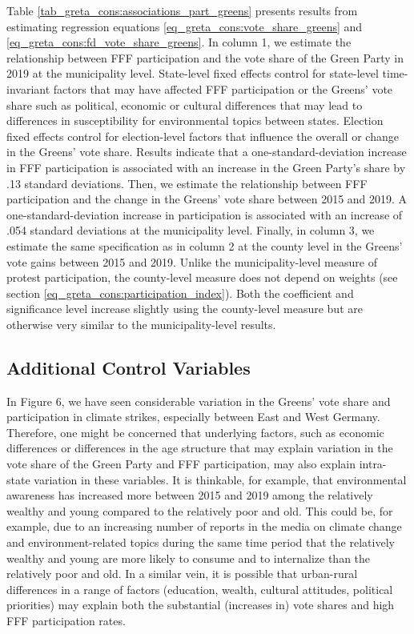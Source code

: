 Table \ref{tab_greta_cons:associations_part_greens} presents results from estimating regression equations \ref{eq_greta_cons:vote_share_greens} and \ref{eq_greta_cons:fd_vote_share_greens}. In column 1, we estimate the relationship between FFF participation and the vote share of the Green Party in 2019 at the municipality level. State-level fixed effects control for state-level time-invariant factors that may have affected FFF participation or the Greens' vote share such as political, economic or cultural differences that may lead to differences in susceptibility for environmental topics between states. Election fixed effects control for election-level factors that influence the overall or change in the Greens' vote share. Results indicate that a one-standard-deviation increase in FFF participation is associated with an increase in the Green Party's share by .13 standard deviations. Then, we estimate the relationship between FFF participation and the change in the Greens' vote share between 2015 and 2019. A one-standard-deviation increase in participation is associated with an increase of .054 standard deviations at the municipality level. Finally, in column 3, we estimate the same specification as in column 2 at the county level in the Greens' vote gains between 2015 and 2019. Unlike the municipality-level measure of protest participation, the county-level measure does not depend on weights (see section \ref*{eq_greta_cons:participation_index}). Both the coefficient and significance level increase slightly using the county-level measure but are otherwise very similar to the municipality-level results. 





\subsection{Additional Control Variables}




In Figure 6, we have seen considerable variation in the Greens' vote share and participation in climate strikes, especially between East and West Germany. Therefore, one might be concerned that underlying factors, such as economic differences or differences in the age structure that may explain variation in the vote share of the Green Party and FFF participation, may also explain intra-state variation in these variables. It is thinkable, for example, that environmental awareness has increased more between 2015 and 2019 among the relatively wealthy and young compared to the relatively poor and old. This could be, for example, due to an increasing number of reports in the media on climate change and environment-related topics during the same time period that the relatively wealthy and young are more likely to consume and to internalize than the relatively poor and old. In a similar vein, it is possible that urban-rural differences in a range of factors (education, wealth, cultural attitudes, political priorities) may explain both the substantial (increases in) vote shares and high FFF participation rates. 

